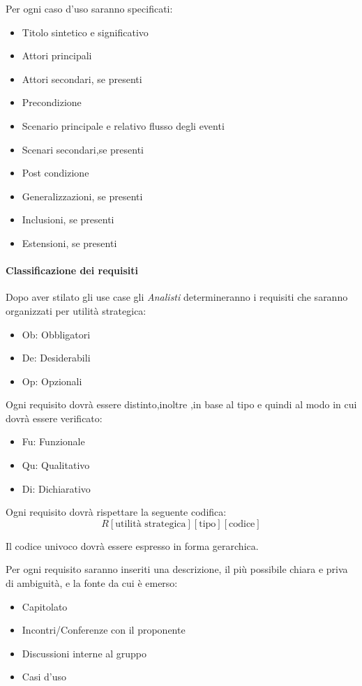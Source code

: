 Per ogni caso d'uso saranno specificati:

\begin{itemize}
\item Titolo sintetico e significativo
\item Attori principali
\item Attori secondari, se presenti
\item Precondizione
\item Scenario principale e relativo flusso degli eventi
\item Scenari secondari,se presenti
\item Post condizione
\item Generalizzazioni, se presenti
\item Inclusioni, se presenti
\item Estensioni, se presenti
\end{itemize}


\paragraph{Classificazione dei requisiti}

Dopo aver stilato gli use case gli  \emph{Analisti}  determineranno i
requisiti che saranno organizzati per utilità strategica:
\begin{itemize}
\item Ob: Obbligatori
\item De: Desiderabili
\item Op: Opzionali
\end{itemize}
Ogni requisito dovrà essere distinto,inoltre ,in base al tipo e quindi al modo in cui dovrà essere verificato:
\begin{itemize}
\item Fu: Funzionale
\item Qu: Qualitativo
\item Di: Dichiarativo
\end{itemize}
Ogni requisito dovrà rispettare la seguente codifica:
$$ R[\text{utilità strategica}][\text{tipo}][\text{codice}] $$

Il codice univoco dovrà essere espresso in forma gerarchica.

Per ogni requisito saranno inseriti una descrizione, il più possibile
chiara e priva di ambiguità, e la fonte da cui è emerso: 
\begin{itemize}
\item Capitolato
\item Incontri/Conferenze con il proponente
\item Discussioni interne al gruppo
\item Casi d'uso
\end{itemize}



